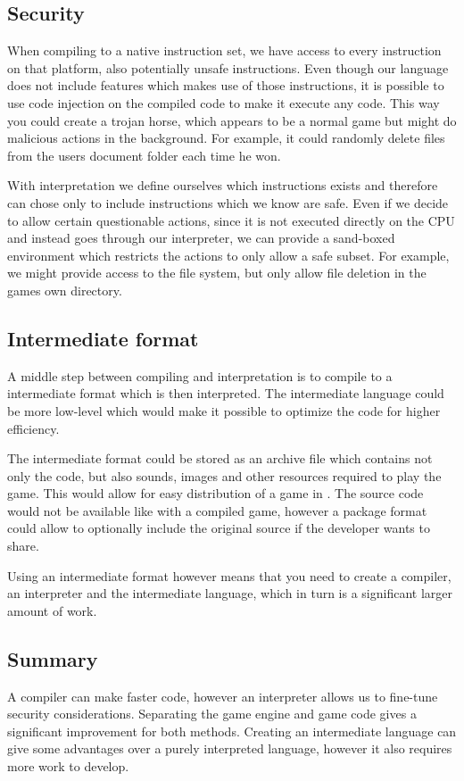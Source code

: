 \subsection{Security}
When compiling to a native instruction set, we have access to every instruction on that platform, also potentially unsafe instructions.
Even though our language does not include features which makes use of those instructions, it is possible to use code injection on the compiled code to make it execute any code.
This way you could create a trojan horse, which appears to be a normal game but might do malicious actions in the background.
For example, it could randomly delete files from the users document folder each time he won.

With interpretation we define ourselves which instructions exists and therefore can chose only to include instructions which we know are safe.
Even if we decide to allow certain questionable actions, since it is not executed directly on the CPU and instead goes through our interpreter, we can provide a sand-boxed environment which restricts the actions to only allow a safe subset. 
For example, we might provide access to the file system, but only allow file deletion in the games own directory.

\subsection{Intermediate format}
A middle step between compiling and interpretation is to compile to a intermediate format which is then interpreted. 
The intermediate language could be more low-level which would make it possible to optimize the code for higher efficiency.

The intermediate format could be stored as an archive file which contains not only the code, but also sounds, images and other resources required to play the game.
This would allow for easy distribution of a game in \productname{}.
The source code would not be available like with a compiled game, however a package format could allow to optionally include the original source if the developer wants to share.

Using an intermediate format however means that you need to create a compiler, an interpreter and the intermediate language, which in turn is a significant larger amount of work.

\subsection{Summary}
A compiler can make faster code, however an interpreter allows us to fine-tune security considerations. 
Separating the game engine and game code gives a significant improvement for both methods.
Creating an intermediate language can give some advantages over a purely interpreted language, however it also requires more work to develop.
